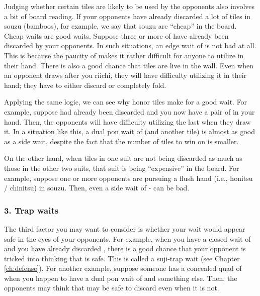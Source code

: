 \bigskip
Judging whether certain tiles are likely to be used by the opponents also involves a bit of board reading. If your opponents have already discarded a lot of tiles in {\jap souzu} (bamboos), for example, we say that {\jap souzu} are ``cheap'' in the board. Cheap waits are good waits. Suppose three or more of {\LARGE{}} have already been discarded by your opponents. In such situations, an edge wait of {\LARGE {}} is not bad at all. This is because the paucity of {\LARGE{}} makes it rather difficult for anyone to utilize {\LARGE{}} in their hand. There is also a good chance that {\LARGE{}} tiles are live in the wall. Even when an opponent draws {\LARGE{}} after you riichi, they will have difficulty utilizing it in their hand; they have to either discard {\LARGE{}} or completely fold. 

\bigskip
Applying the same logic, we can see why honor tiles make for a good wait. 
For example, suppose {\LARGE\zhong} had already been discarded and you now have a pair of {\LARGE\zhong} in your hand. Then, the opponents will have difficulty utilizing the last {\LARGE\zhong} when they draw it. In a situation like this, a dual {\jap pon} wait of {\LARGE\zhong} (and another tile) is almost as good as a side wait, despite the fact that the number of tiles to win on is smaller. 

\bigskip
On the other hand, when tiles in one suit are not being discarded as much as those in the other two suits, that suit is being ``expensive'' in the board. For example, suppose one or more opponents are pursuing a flush hand (i.e., {\jap honitsu} / {\jap chinitsu}) in {\jap souzu}. Then, even a side wait of {\LARGE {}-} can be bad. 

\subsubsection{3. Trap waits}

The third factor you may want to consider is whether your wait \linebreak would appear safe in the eyes of your opponents. For example, when you have a closed wait of {\LARGE{}} and you have already discarded {\LARGE{}}, there is a good chance that your opponent is tricked into thinking that {\LARGE{}} is safe. This is called a {\jap suji}-trap wait (see Chapter \ref{ch:defense}). 
For another example, suppose someone has a concealed quad of {\LARGE{}} when you happen to have a dual {\jap pon} wait of {\LARGE{}} and something else. Then, the opponents may think that {\LARGE{}} may be safe to discard even when it is not. 

